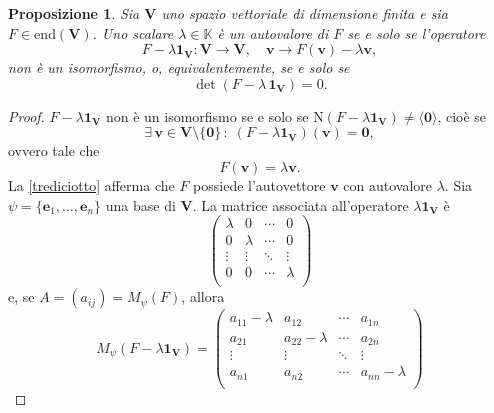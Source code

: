 \documentclass{article}
\theoremstyle{plain}
\newtheorem{prop}[thm]{Proposizione}
\theoremstyle{definition}
\theoremstyle{remark}
\begin{document}
\begin{bxthm}
\begin{prop}\label{tredicinovee}
Sia $\mathbf{V}$ uno spazio vettoriale di dimensione finita e sia $F \in \mathrm{end}(\mathbf{V})$. 
Uno scalare $\lambda \in \mathbb{K}$ è un autovalore di $F$ se e solo se l'operatore
\[
F - \lambda\mathbf{1_V} : \mathbf{V} \to \mathbf{V},\quad\mathbf{v}\to F(\mathbf{v}) - \lambda \mathbf{v},
\]
non è un isomorfismo, o, equivalentemente, se e solo se 
\[\det(F - \lambda \, \mathbf{1_V}) = 0.\]
\end{prop}
\end{bxthm}
\begin{proof}
$F - \lambda \mathbf{1_V}$ non è un isomorfismo se e solo se $\mathrm{N}(F - \lambda\mathbf{1_V}) \neq \langle\mathbf{0}\rangle$, 
cioè se 
\[\exists\,\mathbf{v}\in\mathbf{V}\setminus\{\mathbf{0}\}\,:\;(F - \lambda \mathbf{1_V})(\mathbf{v}) = \mathbf{0},\]
ovvero tale che
\begin{equation}\label{trediciotto}
F(\mathbf{v}) = \lambda \mathbf{v}.
\end{equation}
La \ref{trediciotto} afferma che $F$ possiede l'autovettore $\mathbf{v}$ con autovalore $\lambda$.
Sia $\psi = \{\mathbf{e}_1, \dots, \mathbf{e}_n\}$ una base di $\mathbf{V}$. 
La matrice associata all'operatore $\lambda \mathbf{1_V}$ è
\[
\begin{pmatrix}
\lambda & 0 & \cdots & 0 \\
0 & \lambda & \cdots & 0 \\
\vdots & \vdots & \ddots & \vdots \\
0 & 0 & \cdots & \lambda \\
\end{pmatrix}
\]
e, se $A = (a_{ij}) = M_{\psi}(F)$, allora
\[
M_{\psi}(F - \lambda \mathbf{1_V}) = 
\begin{pmatrix}
a_{11} - \lambda & a_{12} & \cdots & a_{1n} \\
a_{21} & a_{22} - \lambda & \cdots & a_{2n} \\
\vdots & \vdots & \ddots & \vdots \\
a_{n1} & a_{n2} & \cdots & a_{nn} - \lambda \\
\end{pmatrix}
\]    
\end{proof}

\vspace{10pt}
\end{document}
